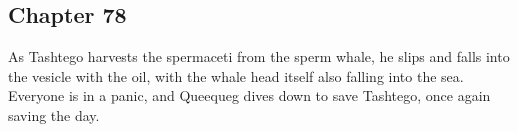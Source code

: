 \subsection{Chapter 78}

As Tashtego harvests the spermaceti from the sperm whale, he slips and falls
into the vesicle with the oil, with the whale head itself also falling into the
sea. Everyone is in a panic, and Queequeg dives down to save Tashtego, once
again saving the day.
